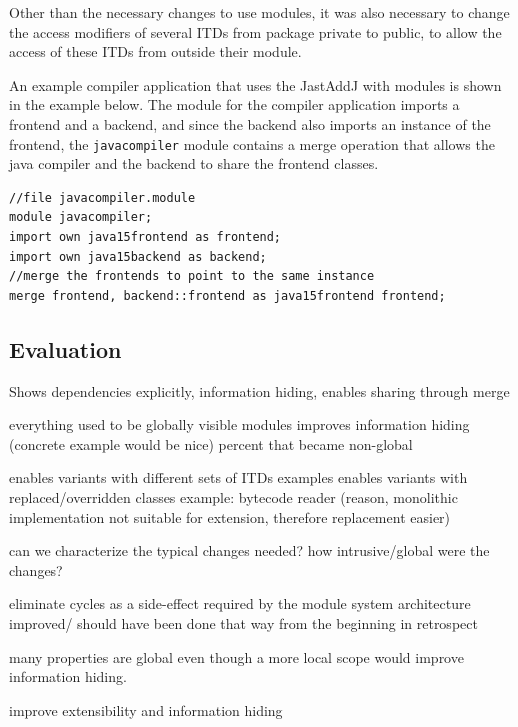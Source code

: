 Other than the necessary changes to use modules, it was also necessary to change the 
access modifiers of several ITDs from package private to public, to allow the 
access of these ITDs from outside their module. 

An example compiler application that uses the JastAddJ with modules is shown in the example below.
The module for the compiler application imports a frontend and a backend, and since the backend 
also imports an instance of the frontend, the \texttt{javacompiler} module contains a merge
operation that allows the java compiler and the backend to share the frontend classes.

\begin{lstlisting}[caption={JastAddJ Compiler Application}]
//file javacompiler.module
module javacompiler;
import own java15frontend as frontend;
import own java15backend as backend;
//merge the frontends to point to the same instance
merge frontend, backend::frontend as java15frontend frontend;
\end{lstlisting}

\subsection{Evaluation}

Shows dependencies explicitly, information hiding, enables sharing through merge

everything used to be globally visible
  modules improves information hiding 
    (concrete example would be nice)
    percent that became non-global

enables variants with different sets of ITDs
  examples
enables variants with replaced/overridden classes
  example: bytecode reader
  (reason, monolithic implementation not suitable for extension, therefore
  replacement easier)

can we characterize the typical changes needed?
how intrusive/global were the changes?

eliminate cycles as a side-effect
  required by the module system
  architecture improved/ should have been done that way from the beginning
  in retrospect



many properties
are global even though a more local scope would improve information hiding.

improve extensibility and information hiding



 
 
